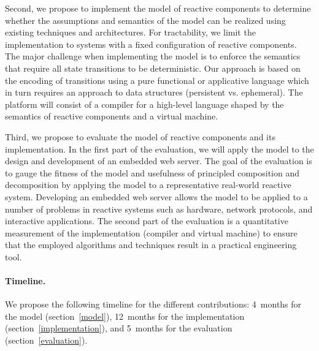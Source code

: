 Second, we propose to implement the model of reactive components to determine whether the assumptions and semantics of the model can be realized using existing techniques and architectures.
For tractability, we limit the implementation to systems with a fixed configuration of reactive components.
The major challenge when implementing the model is to enforce the semantics that require all state transitions to be deterministic.
Our approach is based on the encoding of transitions using a pure functional or applicative language which in turn requires an approach to data structures (persistent vs. ephemeral).
The platform will consist of a compiler for a high-level language shaped by the semantics of reactive components and a virtual machine.

Third, we propose to evaluate the model of reactive components and its implementation.
In the first part of the evaluation, we will apply the model to the design and development of an embedded web server.
The goal of the evaluation is to gauge the fitness of the model and usefulness of principled composition and decomposition by applying the model to a representative real-world reactive system.
Developing an embedded web server allows the model to be applied to a number of problems in reactive systems such as hardware, network protocols, and interactive applications.
The second part of the evaluation is a quantitative measurement of the implementation (compiler and virtual machine) to ensure that the employed algorithms and techniques result in a practical engineering tool.

\paragraph{Timeline.}
We propose the following timeline for the different contributions:  4~months for the model (section~\ref{model}), 12~months for the implementation (section~\ref{implementation}), and 5~months for the evaluation (section~\ref{evaluation}).

